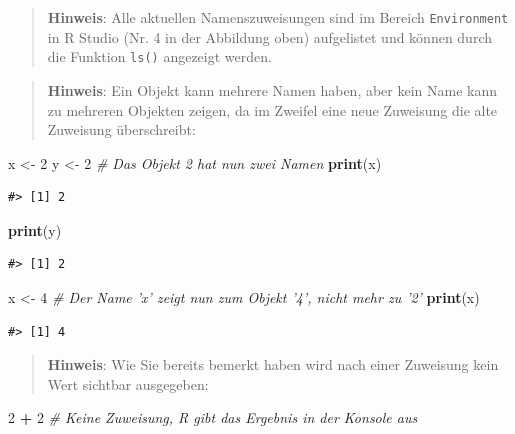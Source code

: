 \documentclass[]{book}
\newenvironment{Shaded}{\begin{snugshade}}{\end{snugshade}}
\newcommand{\KeywordTok}[1]{\textcolor[rgb]{0.13,0.29,0.53}{\textbf{#1}}}
\newcommand{\DecValTok}[1]{\textcolor[rgb]{0.00,0.00,0.81}{#1}}
\newcommand{\StringTok}[1]{\textcolor[rgb]{0.31,0.60,0.02}{#1}}
\newcommand{\CommentTok}[1]{\textcolor[rgb]{0.56,0.35,0.01}{\textit{#1}}}
\newcommand{\OperatorTok}[1]{\textcolor[rgb]{0.81,0.36,0.00}{\textbf{#1}}}
\newcommand{\NormalTok}[1]{#1}
\begin{document}
\begin{quote}
\textbf{Hinweis}: Alle aktuellen Namenszuweisungen sind im Bereich
\texttt{Environment} in R Studio (Nr. 4 in der Abbildung oben)
aufgelistet und können durch die Funktion \texttt{ls()} angezeigt
werden.
\end{quote}

\begin{quote}
\textbf{Hinweis}: Ein Objekt kann mehrere Namen haben, aber kein Name
kann zu mehreren Objekten zeigen, da im Zweifel eine neue Zuweisung die
alte Zuweisung überschreibt:
\end{quote}

\begin{Shaded}
\begin{Highlighting}[]
\NormalTok{x <-}\StringTok{ }\DecValTok{2} 
\NormalTok{y <-}\StringTok{ }\DecValTok{2} \CommentTok{# Das Objekt 2 hat nun zwei Namen}
\KeywordTok{print}\NormalTok{(x)}
\end{Highlighting}
\end{Shaded}

\begin{verbatim}
#> [1] 2
\end{verbatim}

\begin{Shaded}
\begin{Highlighting}[]
\KeywordTok{print}\NormalTok{(y)}
\end{Highlighting}
\end{Shaded}

\begin{verbatim}
#> [1] 2
\end{verbatim}

\begin{Shaded}
\begin{Highlighting}[]
\NormalTok{x <-}\StringTok{ }\DecValTok{4} \CommentTok{# Der Name 'x' zeigt nun zum Objekt '4', nicht mehr zu '2'}
\KeywordTok{print}\NormalTok{(x)}
\end{Highlighting}
\end{Shaded}

\begin{verbatim}
#> [1] 4
\end{verbatim}

\begin{quote}
\textbf{Hinweis}: Wie Sie bereits bemerkt haben wird nach einer
Zuweisung kein Wert sichtbar ausgegeben:
\end{quote}

\begin{Shaded}
\begin{Highlighting}[]
\DecValTok{2} \OperatorTok{+}\StringTok{ }\DecValTok{2} \CommentTok{# Keine Zuweisung, R gibt das Ergebnis in der Konsole aus}
\end{Highlighting}
\end{Shaded}
\end{document}
